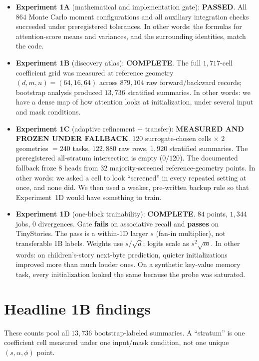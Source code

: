 \documentclass[11pt,a4paper]{report}
\begin{document}
\begin{itemize}[leftmargin=*]
  \item \textbf{Experiment 1A} (mathematical and implementation gate): \textbf{PASSED}. All $864$ Monte Carlo moment configurations and all auxiliary integration checks succeeded under preregistered tolerances. In other words: the formulas for attention-score means and variances, and the surrounding identities, match the code.
  \item \textbf{Experiment 1B} (discovery atlas): \textbf{COMPLETE}. The full $1{,}717$-cell coefficient grid was measured at reference geometry $(d,m,n)=(64,16,64)$ across $879{,}104$ raw forward/backward records; bootstrap analysis produced $13{,}736$ stratified summaries. In other words: we have a dense map of how attention looks at initialization, under several input and mask conditions.
  \item \textbf{Experiment 1C} (adaptive refinement + transfer): \textbf{MEASURED AND FROZEN UNDER FALLBACK}. $120$ surrogate-chosen cells $\times$ $2$ geometries $=240$ tasks, $122{,}880$ raw rows, $1{,}920$ stratified summaries. The preregistered all-stratum intersection is empty ($0/120$). The documented fallback froze $8$ heads from $32$ majority-screened reference-geometry points. In other words: we asked a cell to look ``screened'' in every repeated setting at once, and none did. We then used a weaker, pre-written backup rule so that Experiment~1D would have something to train.
  \item \textbf{Experiment 1D} (one-block trainability): \textbf{COMPLETE}. $84$ points, $1{,}344$ jobs, $0$ divergences. Gate \textbf{fails} on associative recall and \textbf{passes} on TinyStories. The pass is a within-1D larger $s$ (fan-in multiplier), not transferable 1B labels. Weights use $s/\sqrt{d}$; logits scale as $s^2\sqrt{m}$. In other words: on children's-story next-byte prediction, quieter initializations improved more than much louder ones. On a synthetic key-value memory task, every initialization looked the same because the probe was saturated.
\end{itemize}

\section{Headline 1B findings}

These counts pool all $13{,}736$ bootstrap-labeled summaries. A ``stratum'' is one coefficient cell measured under one input/mask condition, not one unique $(s,\alpha,\phi)$ point.
\end{document}
